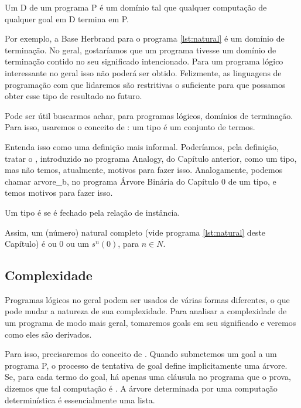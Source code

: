 \begin{definition}
  Um  D de um programa P é um domínio tal que qualquer computação de qualquer goal em D termina em P.
\end{definition}

Por exemplo, a Base Herbrand para o programa \ref{lst:natural} é um domínio de terminação.
No geral, gostaríamos que um programa tivesse um domínio de terminação contido no seu significado intencionado. Para um programa lógico interessante no geral isso não poderá ser obtido. Felizmente, as linguagens de programação com que lidaremos são restritivas o suficiente para que possamos obter esse tipo de resultado no futuro.

Pode ser útil buscarmos achar, para programas lógicos, domínios de terminação. Para isso, usaremos o conceito de : um tipo é um conjunto de termos.

Entenda isso como uma definição mais informal. Poderíamos, pela definição, tratar o , introduzido no programa Analogy, do Capítulo anterior, como um tipo, mas não temos, atualmente, motivos para fazer isso.
Analogamente, podemos chamar arvore\_b, no programa Árvore Binária do Capítulo 0 de um tipo, %
e temos motivos para fazer isso.

\begin{definition} Um tipo é  se é fechado pela relação de instância.
\end{definition}

Assim, um (número) natural completo (vide programa \ref{lst:natural} deste Capítulo) é ou 0 ou um $s^n(0)$, para $n \in N$.

\subsection{Complexidade}

Programas lógicos no geral podem ser usados de várias formas diferentes, o que pode mudar a natureza de sua complexidade. Para analisar a complexidade de um programa de modo mais geral, tomaremos goals em seu significado e veremos como eles são derivados.

Para isso, precisaremos do conceito de . Quando submetemos um goal a um programa P, o processo de tentativa de goal define implicitamente uma árvore. Se, para cada termo do goal, há apenas uma cláusula no programa que o prova, dizemos que tal computação é . A árvore determinada por uma computação determinística é essencialmente uma lista.

